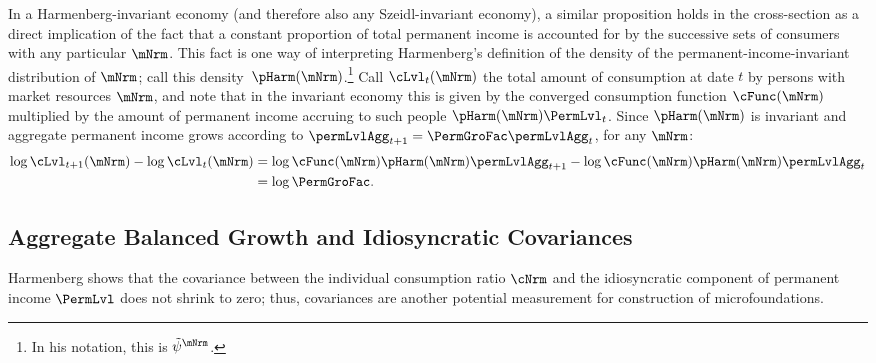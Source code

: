 \documentclass[BufferStockTheory]{subfiles}
\begin{document}
In a Harmenberg-invariant economy (and therefore also any Szeidl-invariant economy), a similar proposition holds in the cross-section as a direct implication of the fact that a constant proportion of total permanent income is accounted for by the successive sets of consumers with any particular $\mNrm$.  This fact is one way of interpreting Harmenberg's definition of the density of the permanent-income-invariant distribution of $\mNrm$; call this density~$\pHarm(\mNrm)$.\footnote{In his notation, this is $\tilde{\psi}^{\mNrm}$.}  Call $\cLvl_{t}(\mNrm)$ the total amount of consumption at date $t$ by persons with market resources $\mNrm$, and note that in the invariant economy this is given by the converged consumption function $\cFunc(\mNrm)$ multiplied by the amount of permanent income accruing to such people $\pHarm(\mNrm)\PermLvl_{t}$.  Since $\pHarm(\mNrm)$ is invariant and aggregate permanent income grows according to $\permLvlAgg_{t+1} = \PermGroFac \permLvlAgg_{t}$, for any $\mNrm$:
\begin{equation*}
  \begin{split}
    \log \cLvl_{t+1}(\mNrm) - \log \cLvl_{t}(\mNrm) &  \notag
    = \log \cFunc(\mNrm) \pHarm(\mNrm)\permLvlAgg_{t+1} - \log \cFunc(\mNrm)\pHarm(\mNrm)\permLvlAgg_{t} \\
    & = \log \PermGroFac.
  \end{split}
\end{equation*}



\hypertarget{Balanced-Growth-Of-Covariances}{}
\subsection{Aggregate Balanced Growth and Idiosyncratic Covariances}\label{subsec:Covariances}

Harmenberg shows that the covariance between the individual consumption ratio $\cNrm$ and the idiosyncratic component of permanent income $\PermLvl$ does not shrink to zero; thus, covariances are another potential measurement for construction of microfoundations.  %
\end{document}
